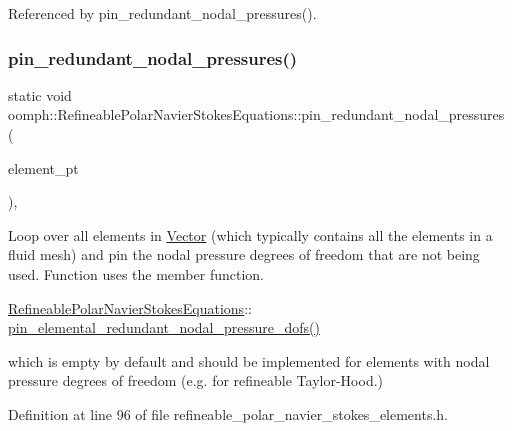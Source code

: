 Referenced by pin\+\_\+redundant\+\_\+nodal\+\_\+pressures().

\mbox{\label{classoomph_1_1RefineablePolarNavierStokesEquations_a55d6ecfc3aa3a714f320edf3cbd7f69d}} 
\subsubsection{\texorpdfstring{pin\+\_\+redundant\+\_\+nodal\+\_\+pressures()}{pin\_redundant\_nodal\_pressures()}}
{\footnotesize\ttfamily static void oomph\+::\+Refineable\+Polar\+Navier\+Stokes\+Equations\+::pin\+\_\+redundant\+\_\+nodal\+\_\+pressures (\begin{DoxyParamCaption}\item[{const \hyperlink{classoomph_1_1Vector}{Vector}$<$ \hyperlink{classoomph_1_1GeneralisedElement}{Generalised\+Element} $\ast$$>$ \&}]{element\+\_\+pt }\end{DoxyParamCaption})\hspace{0.3cm}{\ttfamily [inline]}, {\ttfamily [static]}}



Loop over all elements in \hyperlink{classoomph_1_1Vector}{Vector} (which typically contains all the elements in a fluid mesh) and pin the nodal pressure degrees of freedom that are not being used. Function uses the member function. 


\begin{DoxyItemize}
\item {\ttfamily \hyperlink{classoomph_1_1RefineablePolarNavierStokesEquations}{Refineable\+Polar\+Navier\+Stokes\+Equations}\+:}\+: \hyperlink{classoomph_1_1RefineablePolarNavierStokesEquations_a29a784c096caf88d102b8fd13dc686e6}{pin\+\_\+elemental\+\_\+redundant\+\_\+nodal\+\_\+pressure\+\_\+dofs()}
\end{DoxyItemize}which is empty by default and should be implemented for elements with nodal pressure degrees of freedom (e.\+g. for refineable Taylor-\/\+Hood.) 

Definition at line 96 of file refineable\+\_\+polar\+\_\+navier\+\_\+stokes\+\_\+elements.\+h.




